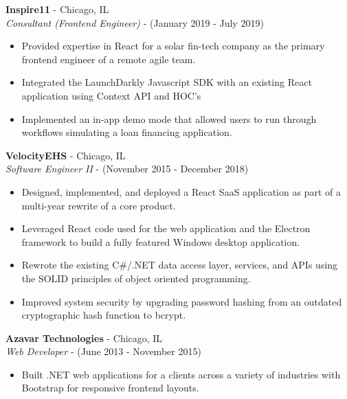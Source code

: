 \documentclass[11pt]{article}
\begin{document}
\begin{paracol}{2}
\noindent \textbf{Inspire11} - Chicago, IL \\
\textit{Consultant (Frontend Engineer)} - {\footnotesize{(January 2019 - July 2019)}} 
\begin{itemize}
    \item Provided expertise in React for a solar fin-tech company as the primary frontend engineer of a remote agile team.
    \item Integrated the LaunchDarkly Javascript SDK with an existing React application using Context API and HOC's
    \item Implemented an in-app demo mode that allowed users to run through workflows simulating a loan financing application.
\end{itemize} 

\noindent \textbf{VelocityEHS} - Chicago, IL \\
\textit{Software Engineer II} - {\footnotesize{(November 2015 - December 2018)}}
\begin{itemize}
    \item Designed, implemented, and deployed a React SaaS application as part of a multi-year rewrite of a core product.
    \item Leveraged React code used for the web application and the Electron framework to build a fully featured Windows desktop application.
    \item Rewrote the existing C\#/.NET data access layer, services, and APIs using the SOLID principles of object oriented programming.
    \item Improved system security by upgrading password hashing from an outdated cryptographic hash function to bcrypt.
\end{itemize} 

\noindent \textbf{Azavar Technologies} - Chicago, IL \\
\textit{Web Developer} - {\footnotesize(June 2013 - November 2015)}
\begin{itemize}
    \item Built .NET web applications for a clients across a variety of industries with Bootstrap for responsive frontend layouts.
\end{itemize}
    
\end{paracol}
\end{document}
